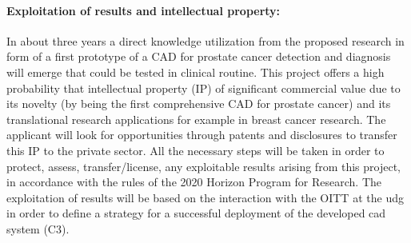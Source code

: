 \paragraph{Exploitation of results and intellectual property:}
In about three years a direct knowledge utilization from the proposed research in form of a first prototype of a CAD for prostate cancer detection and diagnosis will emerge that could be tested in clinical routine.
This project offers a high probability that intellectual property (IP) of significant commercial value due to its novelty (by being the first comprehensive CAD for prostate cancer) and its translational research applications for example in breast cancer research.
The applicant will look for opportunities through patents and disclosures to transfer this IP to the private sector.
All the necessary steps will be taken in order to protect, assess, transfer/license, any exploitable results arising from this project, in accordance with the rules of the 2020 Horizon Program for Research.
The exploitation of results will be based on the interaction with the OITT at the \ac{udg} in order to define a strategy for a successful deployment of the developed \ac{cad} system (C3).
